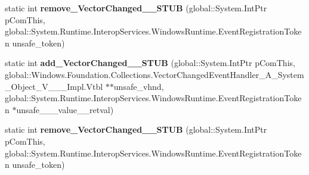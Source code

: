 \begin{DoxyCompactItemize}
static int {\bfseries remove\+\_\+\+Vector\+Changed\+\_\+\+\_\+\+S\+T\+UB} (global\+::\+System.\+Int\+Ptr p\+Com\+This, global\+::\+System.\+Runtime.\+Interop\+Services.\+Windows\+Runtime.\+Event\+Registration\+Token unsafe\+\_\+token)
\item 
\mbox{\label{struct_windows_1_1_foundation_1_1_collections_1_1_i_observable_vector___a___system___object___v_______impl_1_1_vtbl_a73603b0a65e801f868e563087158e9af}} 
static int {\bfseries add\+\_\+\+Vector\+Changed\+\_\+\+\_\+\+S\+T\+UB} (global\+::\+System.\+Int\+Ptr p\+Com\+This, global\+::\+Windows.\+Foundation.\+Collections.\+Vector\+Changed\+Event\+Handler\+\_\+\+A\+\_\+\+System\+\_\+\+Object\+\_\+\+V\+\_\+\+\_\+\+\_\+\+Impl.\+Vtbl $\ast$$\ast$unsafe\+\_\+vhnd, global\+::\+System.\+Runtime.\+Interop\+Services.\+Windows\+Runtime.\+Event\+Registration\+Token $\ast$unsafe\+\_\+\+\_\+\+\_\+value\+\_\+\+\_\+retval)
\item 
\mbox{\label{struct_windows_1_1_foundation_1_1_collections_1_1_i_observable_vector___a___system___object___v_______impl_1_1_vtbl_aabf887f0240da466ea88505e0d04bc08}} 
static int {\bfseries remove\+\_\+\+Vector\+Changed\+\_\+\+\_\+\+S\+T\+UB} (global\+::\+System.\+Int\+Ptr p\+Com\+This, global\+::\+System.\+Runtime.\+Interop\+Services.\+Windows\+Runtime.\+Event\+Registration\+Token unsafe\+\_\+token)
\end{DoxyCompactItemize}
